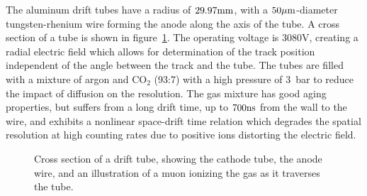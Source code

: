 The aluminum drift tubes have a radius of $29.97 \mathrm{mm}$, with a $50 \mu\mathrm{m}$-diameter tungsten-rhenium wire forming the anode along the axis of the tube. A cross section of a tube is shown in figure~\ref{fig:ATLAS-MS-MDT-xsec}. The operating voltage is $3080 \mbox{V}$, creating a radial electric field which allows for determination of the track position independent of the angle between the track and the tube. The tubes are filled with a mixture of argon and CO$_2$ (93:7) with a high pressure of 3~bar to reduce the impact of diffusion on the resolution. The gas mixture has good aging properties, but suffers from a long drift time, up to $700 \mathrm{ns}$ from the wall to the wire, and exhibits a nonlinear space-drift time relation which degrades the spatial resolution at high counting rates due to positive ions distorting the electric field. 

\begin{figure}
	\centering
	\caption{Cross section of a drift tube, showing the cathode tube, the anode wire, and an illustration of a muon ionizing the gas as it traverses the tube.}
	\label{fig:ATLAS-MS-MDT-xsec}
\end{figure}

